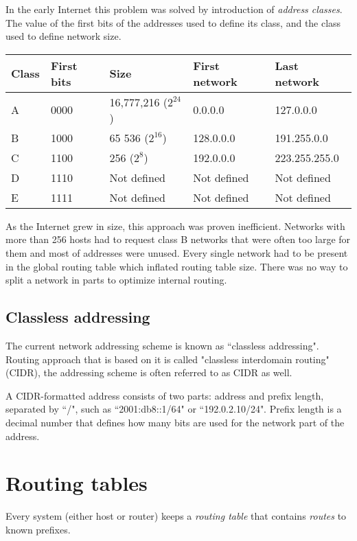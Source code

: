 In the early Internet this problem was solved by introduction of \emph{address classes}. The value of the first
bits of the addresses used to define its class, and the class used to define network size.

\begin{tabular}{|l|l|l|l|l|}
\hline
Class & First bits & Size & First network & Last network \\
\hline
A & 0000 & 16,777,216 ($2^{24}$) & 0.0.0.0 & 127.0.0.0 \\
\hline
B & 1000 & 65 536 ($2^{16}$) & 128.0.0.0 & 191.255.0.0 \\
\hline
C & 1100 & 256 ($2^{8}$) & 192.0.0.0 & 223.255.255.0 \\
\hline
D & 1110 & Not defined & Not defined & Not defined \\
\hline
E & 1111 & Not defined & Not defined & Not defined \\
\hline
\end{tabular}

As the Internet grew in size, this approach was proven inefficient. Networks with more than 256 hosts had to
request class B networks that were often too large for them and most of addresses were unused. Every single
network had to be present in the global routing table which inflated routing table size. There was no way
to split a network in parts to optimize internal routing.

\subsection{Classless addressing}

The current network addressing scheme is known as ``classless addressing". Routing approach that is based on it
is called "classless interdomain routing" (CIDR), the addressing scheme is often referred to as	CIDR as well.

A CIDR-formatted address consists of two parts: address and prefix length, separated by ``/", such as 
``2001:db8::1/64" or ``192.0.2.10/24". Prefix length is a decimal number that defines how many bits are used
for the network part of the address.




\section{Routing tables}

Every system (either host or router) keeps a \emph{routing table} that contains \emph{routes} to known prefixes.

